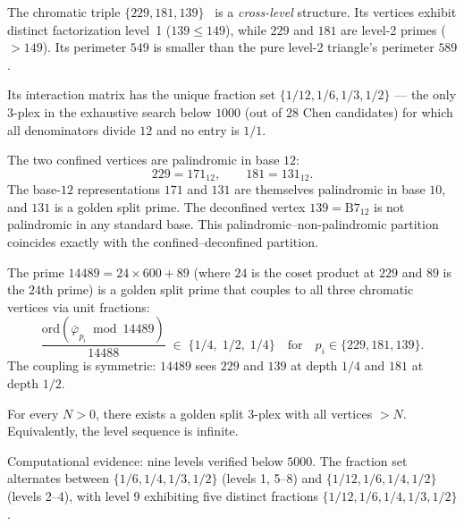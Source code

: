 \begin{result}
\label{res:crosslevel}
The chromatic triple $\{229, 181, 139\}$~\cite{larue_chromatic} is a \emph{cross-level}
structure. Its vertices exhibit distinct factorization level~1 ($139 \leq 149$),
while $229$ and $181$ are level-2 primes ($> 149$). Its perimeter
$549$ is smaller than the pure level-2 triangle's perimeter $589$.

Its interaction matrix has the unique fraction set
$\{1/12, 1/6, 1/3, 1/2\}$ --- the only $3$-plex in the
exhaustive search below $1000$ (out of $28$ Chen candidates)
for which all denominators divide $12$ and no entry is $1/1$.
\end{result}

\begin{result}
\label{res:palindrome}
The two confined vertices are palindromic in base $12$:
\[
229 = 171_{12}, \qquad 181 = 131_{12}.
\]
The base-$12$ representations $171$ and $131$ are themselves
palindromic in base $10$, and $131$ is a golden split prime.
The deconfined vertex $139 = \mathrm{B7}_{12}$ is not palindromic
in any standard base. This palindromic--non-palindromic partition
coincides exactly with the confined--deconfined partition.
\end{result}

\begin{result}
\label{res:bridge}
The prime $14489 = 24 \times 600 + 89$
(where $24$ is the coset product at $229$ and $89$ is the $24$th
prime) is a golden split prime that couples to all three chromatic
vertices via unit fractions:
\[
\frac{\mathrm{ord}(\bar\varphi_{p_i} \bmod 14489)}{14488}
\;\in\; \{1/4,\; 1/2,\; 1/4\}
\quad\text{for}\quad p_i \in \{229, 181, 139\}.
\]
The coupling is symmetric: $14489$ sees $229$ and $139$ at depth
$1/4$ and $181$ at depth $1/2$.
\end{result}

\begin{conjecture}
\label{conj:hierarchy}
For every $N > 0$, there exists a golden split $3$-plex with all
vertices $> N$. Equivalently, the level sequence is infinite.
\end{conjecture}

Computational evidence: nine levels verified below $5000$.
The fraction set alternates between
$\{1/6, 1/4, 1/3, 1/2\}$ (levels 1, 5--8) and
$\{1/12, 1/6, 1/4, 1/2\}$ (levels 2--4), with level 9 exhibiting
five distinct fractions $\{1/12, 1/6, 1/4, 1/3, 1/2\}$.

